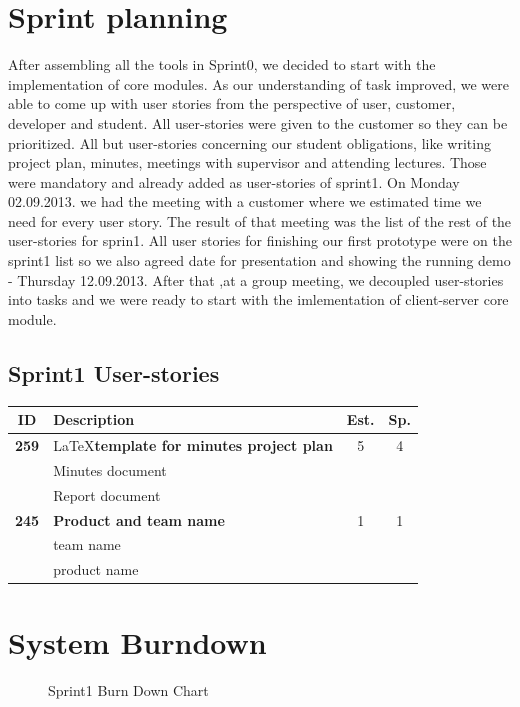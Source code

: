 \section{Sprint planning}
After assembling all the tools in Sprint0, we decided to start with the implementation of core modules.
As our understanding of task improved, we were able to come up with user stories from the perspective of user, customer, developer and student.
All user-stories were given to the customer so they can be prioritized. 
All but user-stories concerning our student obligations, like writing project plan, minutes, meetings with supervisor and attending lectures.
Those were mandatory and already added as user-stories of sprint1.
On Monday 02.09.2013. we had the meeting with a customer where we estimated time we need for every user story.
The result of that meeting was the list of the rest of the user-stories for sprin1.
All user stories for finishing our first prototype were on the sprint1 list so we also agreed date for presentation and showing the running demo - Thursday 12.09.2013. 
After that ,at a group meeting, we decoupled user-stories into tasks and we were ready to start with the imlementation of client-server core module.


\subsection{Sprint1 User-stories}

\begin{longtable}{cp{8cm}cc}
\toprule
\textbf{ID} 	& \textbf{Description} 									& \textbf{Est.} & \textbf{Sp.} \\
\hline
\textbf{259} 	& \LaTeX \textbf{template for minutes project plan} 	& 5 			& 4 \\
				& Minutes document \\
				& Report document \\
\hline						
\textbf{245} 	& \textbf{Product and team name} 						& 1 			& 1 \\
				& team name \\
				& product name \\
\bottomrule
\end{longtable}

\section{System Burndown}

\begin{figure}[H]
	\centering
	\caption{Sprint1 Burn Down Chart}
	\label{fig:sprint1_burn_down_chart}
\end{figure}

